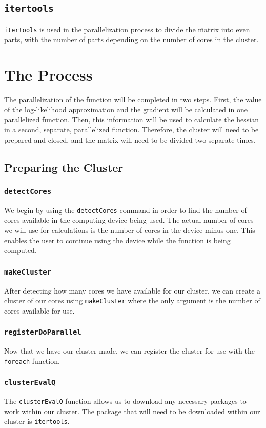 \documentclass{article}
\begin{document}
\subsection{\texttt{itertools}}
\texttt{itertools} is used in the parallelization process to divide the \u matrix into even parts, with the number of parts depending on the number of cores in the cluster. 

\section{The Process}
The parallelization of the function will be completed in two steps. First, the value of the log-likelihood approximation and the gradient will be calculated in one parallelized function. Then, this information will be used to calculate the hessian in a second, separate, parallelized function. Therefore, the cluster will need to be prepared and closed, and the matrix will need to be divided two separate times. 

\subsection{Preparing the Cluster}
\subsubsection{\texttt{detectCores}}
We begin by using the \texttt{detectCores} command in order to find the number of cores available in the computing device being used. The actual number of cores we will use for calculations is the number of cores in the device minus one. This enables the user to continue using the device while the function is being computed. 

\subsubsection{\texttt{makeCluster}}
After detecting how many cores we have available for our cluster, we can create a cluster of our cores using \texttt{makeCluster} where the only argument is the number of cores available for use. 

\subsubsection{\texttt{registerDoParallel}}
Now that we have our cluster made, we can register the cluster for use with the \texttt{foreach} function.

\subsubsection{\texttt{clusterEvalQ}}
The \texttt{clusterEvalQ} function allows us to download any necessary packages to work within our cluster. The package that will need to be downloaded within our cluster is \texttt{itertools}.
\end{document}
